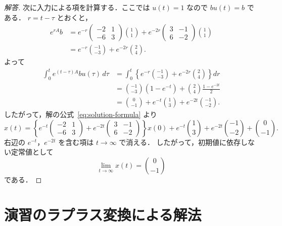 \documentclass[article,paper=a4paper]{jlreq}
\begin{document}
\begin{proof}[解答]
次に入力による項を計算する．ここでは $u(t)=1$ なので $bu(t)=b$ である．
$r=t-\tau$ とおくと，
\begin{align*}
  e^{rA}b
    &=
    e^{-r}
    \begin{pmatrix}
      -2 & 1\\
      -6 & 3
    \end{pmatrix}
    \binom{1}{1}
    +
    e^{-2r}
    \begin{pmatrix}
      3 & -1\\
      6 & -2
    \end{pmatrix}
    \binom{1}{1}\\
    &=
    e^{-r}\binom{-1}{-3}
    +
    e^{-2r}\binom{2}{4}.
\end{align*}
よって
\begin{align*}
  \int_0^t e^{(t-\tau)A}bu(\tau)\,d\tau
    &=
    \int_0^t
      \left\{
        e^{-r}\binom{-1}{-3}
        +
        e^{-2r}\binom{2}{4}
      \right\}dr\\
    &=
    \binom{-1}{-3}(1-e^{-t})
      +
      \binom{2}{4}\frac{1-e^{-2t}}{2}\\
    &=
    \binom{0}{-1}
      +
      e^{-t}\binom{1}{3}
      +
      e^{-2t}\binom{-1}{-2}.
\end{align*}
したがって，解の公式~\eqref{eq:solution-formula} より
\[
  x(t)
    =
    \left\{
      e^{-t}
      \begin{pmatrix}
        -2 & 1\\
        -6 & 3
      \end{pmatrix}
      +
      e^{-2t}
      \begin{pmatrix}
        3 & -1\\
        6 & -2
      \end{pmatrix}
    \right\}x(0)
    +
    e^{-t}\binom{1}{3}
    +
    e^{-2t}\binom{-1}{-2}
    +
    \binom{0}{-1}.
\]
右辺の $e^{-t}$，$e^{-2t}$ を含む項は $t\to\infty$ で消える．
したがって，初期値に依存しない定常値として
\[
  \lim_{t\to\infty}x(t)=\binom{0}{-1}
\]
である．
\end{proof}

\section{演習のラプラス変換による解法}
\end{document}
